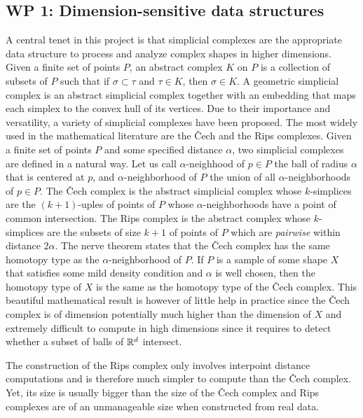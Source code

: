 \subsection*{WP 1:  Dimension-sensitive data structures} 

A central tenet in this project is that simplicial complexes are the appropriate data structure
to process and analyze complex shapes in higher dimensions. Given a finite set of points $P$, an abstract complex $K$ on $P$ is a collection of subsets of $P$ such that 
if $\sigma\subset \tau$ and $\tau\in K$, then $\sigma \in K$.
A geometric simplicial complex is an abstract simplicial complex together with an embedding that maps each simplex to the convex hull of its vertices. %
Due to their importance and versatility, a variety of simplicial complexes have been proposed.
The most widely used in the mathematical literature are the \v{C}ech and the Rips complexes.
 Given a finite set of points $P$ and some specified distance $\alpha$, two simplicial complexes are defined in a natural way. Let us call $\alpha$-neighhood of $p\in P$ the ball of radius $\alpha$ that is centered at $p$, and $\alpha$-neighborhood of $P$ the union of all $\alpha$-neighborhoods of $p\in P$.  The \v{C}ech complex is the abstract simplicial complex whose $k$-simplices are the $(k+1)$-uples of points of $P$ whose $\alpha$-neighborhoods have a point of common intersection.  The Rips complex is the abstract complex whose $k$-simplices are the subsets of size $k+1$ of points of $P$ which are {\em pairwise} within distance $2\alpha$. The nerve theorem states that the \v{C}ech complex has the same homotopy type as the $\alpha$-neighborhood of $P$. If $P$ is a sample of some shape $X$ that satisfies some mild density condition and $\alpha$ is well chosen, then the homotopy type of $X$ is the same as the homotopy type of the \v{C}ech complex. 
 This beautiful mathematical result is however of little help in practice since the \v{C}ech complex is of dimension potentially much higher than the dimension of $X$ and extremely difficult to compute in high dimensions since it requires to detect whether a subset of balls of $\mathbb R ^d$ intersect. 

The construction of the Rips complex only involves interpoint distance computations and is therefore much  simpler to compute than the \v{C}ech complex. Yet, its size is usually bigger than the size of the \v{C}ech complex and Rips complexes are of an unmanageable size when constructed from real data. 

